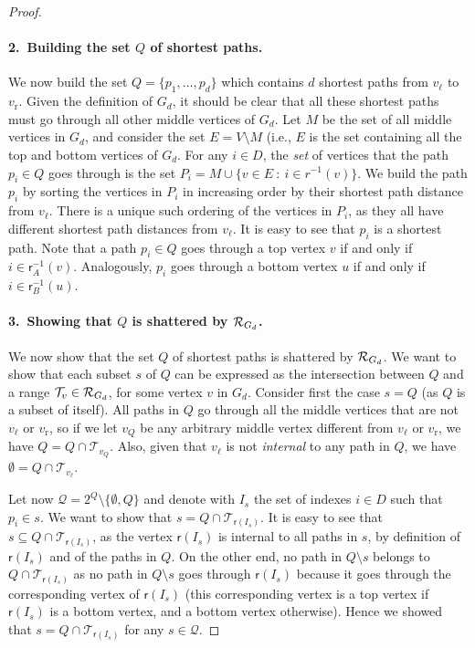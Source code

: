 \begin{proof}
  \paragraph{2.~Building the set $Q$ of shortest paths.} We now build the set
  $Q=\{p_1,\dotsc,p_d\}$ which contains $d$ shortest paths from $v_\ell$ to
  $v_\mathrm{r}$. Given the definition of $G_d$, it should be clear that all
  these shortest paths must go through all other middle vertices of $G_d$. Let
  $M$ be the set of all middle vertices in $G_d$, and consider the set
  $E=V\setminus M$ (i.e., $E$ is the set containing all the top and bottom
  vertices of $G_d$. For any $i\in D$, the \emph{set} of vertices that the path
  $p_i\in Q$ goes through is the set $P_i=M\cup\{v\in E ~:~ i \in r^{-1}(v)\}$.
  We build the path $p_i$ by sorting the vertices in $P_i$ in increasing order
  by their shortest path distance from $v_\ell$. There is a unique such ordering
  of the vertices in $P_i$, as they all have different shortest path distances
  from $v_\ell$. It is easy to see that $p_i$ is a shortest path. Note that a
  path $p_i\in Q$ goes through a top vertex $v$ if and only if
  $i\in\mathsf{r}^{-1}_A(v)$. Analogously, $p_i$ goes through a bottom vertex
  $u$ if and only if $i\in\mathsf{r}^{-1}_B(u)$. 

  \paragraph{3.~Showing that $Q$ is shattered by $\mathcal{R}_{G_d}$.} We now show
  that the set $Q$ of shortest paths is shattered by $\mathcal{R}_{G_d}$. We want to
  show that each subset $s$ of $Q$ can be expressed as the intersection between
  $Q$ and a range $\mathcal{T}_v\in\mathcal{R}_{G_d}$, for some vertex $v$ in $G_d$.
  Consider first the case $s=Q$ (as $Q$ is a subset of itself). All paths in $Q$
  go through all the middle vertices that are not $v_\ell$ or $v_\mathrm{r}$, so
  if we let $v_Q$ be any arbitrary middle vertex different from $v_\ell$ or
  $v_\mathrm{r}$, we have $Q=Q\cap\mathcal{T}_{v_Q}$. Also, given that $v_\ell$
  is not \emph{internal} to any path in $Q$, we have
  $\emptyset=Q\cap\mathcal{T}_{v_\ell}$.
  
  Let now $\mathcal{Q}=2^{Q}\setminus\{\emptyset,Q\}$ and denote with $I_s$
  the set of indexes $i\in D$ such that $p_i\in s$. We want to show that
  $s=Q\cap\mathcal{T}_{\mathsf{r}(I_s)}$. It is easy to see that $s\subseteq
  Q\cap\mathcal{T}_{\mathsf{r}(I_s)}$, as the vertex $\mathsf{r}(I_s)$ is
  internal to all paths in $s$, by definition of $\mathsf{r}(I_s)$ and of the
  paths in $Q$. On the other end, no path in $Q\setminus s$ belongs to
  $Q\cap\mathcal{T}_{\mathsf{r}(I_s)}$ as no path in $Q\setminus s$ goes through
  $\mathsf{r}(I_s)$ because it goes through the corresponding vertex of
  $\mathsf{r}(I_s)$ (this corresponding vertex is a top vertex if
  $\mathsf{r}(I_s)$ is a bottom vertex, and a bottom vertex otherwise). Hence we
  showed that $s=Q\cap\mathcal{T}_{\mathsf{r}(I_s)}$
  for any $s\in\mathcal{Q}$.
  

\end{proof}
